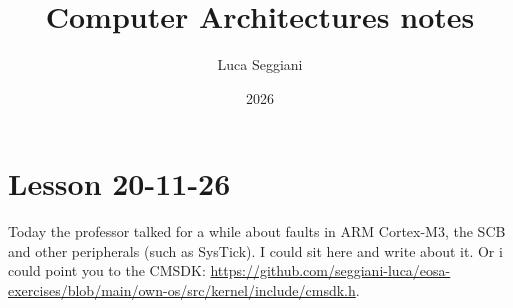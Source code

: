 \documentclass[a4paper,11pt]{article}
\title{Computer Architectures notes}
\author{Luca Seggiani}
\date{2026}
\begin{document}
\section{Lesson 20-11-26}

\thispagestyle{empty}
\pagestyle{fancy}

Today the professor talked for a while about faults in ARM Cortex-M3, the SCB and other peripherals (such as SysTick).
I could sit here and write about it.
Or i could point you to the CMSDK: \url{https://github.com/seggiani-luca/eosa-exercises/blob/main/own-os/src/kernel/include/cmsdk.h}.
\end{document}
